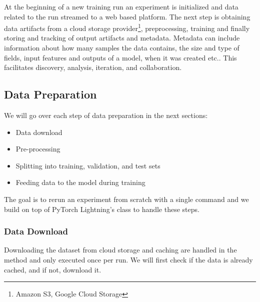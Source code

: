 At the beginning of a new training run an experiment is initialized and data related to the run streamed to a web based platform.
The next step is obtaining data artifacts from a cloud storage provider\footnote{Amazon S3, Google Cloud Storage}, preprocessing, training and finally storing and tracking of output artifacts and metadata.
Metadata can include information about how many samples the data contains, the size and type of fields, input features and outputs of a model, when it was created etc..
This facilitates discovery, analysis, iteration, and collaboration.

\subsection{Data Preparation}
We will go over each step of data preparation in the next sections:
\begin{itemize}
    \item Data download
    \item Pre-processing
    \item Splitting into training, validation, and test sets
    \item Feeding data to the model during training
\end{itemize}

The goal is to rerun an experiment from scratch with a single command and we build on top of PyTorch Lightning's  class to handle these steps.
\subsubsection{Data Download}
Downloading the dataset from cloud storage and caching are handled in the  method and only executed once per run.
We will first check if the data is already cached, and if not, download it.

